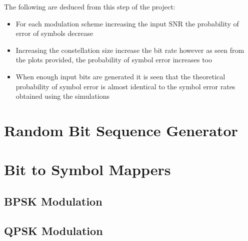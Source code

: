 \documentclass[]{article}
\begin{document}
The following are deduced from this step of the project:
\begin{itemize}
\item For each modulation scheme increasing the input SNR the probability of error of symbols decrease
\item Increasing the constellation size increase the bit rate however as seen from the plots provided, the probability of symbol error increases too
\item When enough input bits are generated it is seen that the theoretical probability of symbol error is almost identical to the symbol error rates obtained using the simulations    
\end{itemize}

\appendix
\newpage
%


\section{Random Bit Sequence Generator}
\label{app:random_bit_generator}

\cleardoublepage
\newpage

\section{Bit to Symbol Mappers}
\label{app:bittosym}
\subsection{BPSK Modulation }
\label{app:bpsk_mod}
%


\cleardoublepage  %
\newpage

\subsection{QPSK Modulation}
\label{app:qpsk_mod}

\cleardoublepage  %
\newpage
\end{document}
